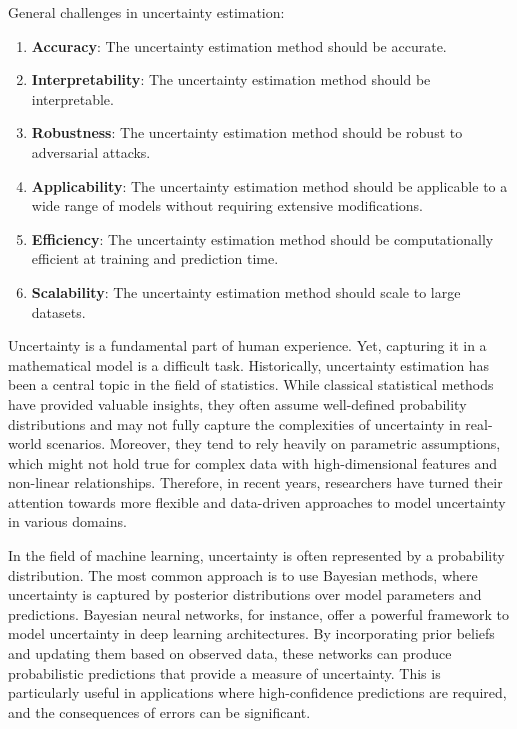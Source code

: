 







\iffalse

General challenges in uncertainty estimation:
\begin{enumerate}
    \item \textbf{Accuracy}: The uncertainty estimation method should be accurate.
    \item \textbf{Interpretability}: The uncertainty estimation method should be interpretable.
    \item \textbf{Robustness}: The uncertainty estimation method should be robust to adversarial attacks.
    \item \textbf{Applicability}: The uncertainty estimation method should be applicable to a wide range of models without requiring extensive modifications.
    \item \textbf{Efficiency}: The uncertainty estimation method should be computationally efficient at training and prediction time.
    \item \textbf{Scalability}: The uncertainty estimation method should scale to large datasets.
\end{enumerate}







Uncertainty is a fundamental part of human experience. Yet, capturing it in a mathematical model is a difficult task. Historically, uncertainty estimation has been a central topic in the field of statistics. While classical statistical methods have provided valuable insights, they often assume well-defined probability distributions and may not fully capture the complexities of uncertainty in real-world scenarios. Moreover, they tend to rely heavily on parametric assumptions, which might not hold true for complex data with high-dimensional features and non-linear relationships. Therefore, in recent years, researchers have turned their attention towards more flexible and data-driven approaches to model uncertainty in various domains.

In the field of machine learning, uncertainty is often represented by a probability distribution. The most common approach is to use Bayesian methods, where uncertainty is captured by posterior distributions over model parameters and predictions. Bayesian neural networks, for instance, offer a powerful framework to model uncertainty in deep learning architectures. By incorporating prior beliefs and updating them based on observed data, these networks can produce probabilistic predictions that provide a measure of uncertainty. This is particularly useful in applications where high-confidence predictions are required, and the consequences of errors can be significant.

